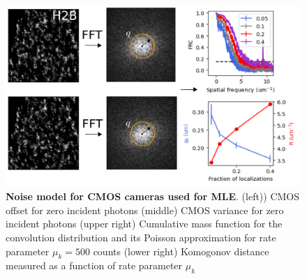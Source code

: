\begin{figure}
\begin{center}
\includegraphics[width=14cm]{figures/FRC.png}
\end{center}
\caption{\textbf{Noise model for CMOS cameras used for MLE}. (left)) CMOS offset for zero incident photons (middle) CMOS variance for zero incident photons (upper right) Cumulative mass function for the convolution distribution and its Poisson approximation for rate parameter $\mu_{k} = 500$ counts (lower right) Komogonov distance measured as a function of rate parameter $\mu_{k}$}
\end{figure}


